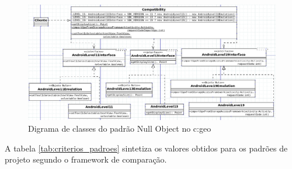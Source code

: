 \begin{figure}[H]
\centering
\includegraphics[scale=0.6, angle=90]{imagens/null_object.png}
\caption{Digrama de classes do padrão Null Object no c:geo}
\label{fig:null_object}
\end{figure}


A tabela \ref{tab:criterios_padroes} sintetiza os valores obtidos para os padrões
de projeto segundo o framework de comparação. 

